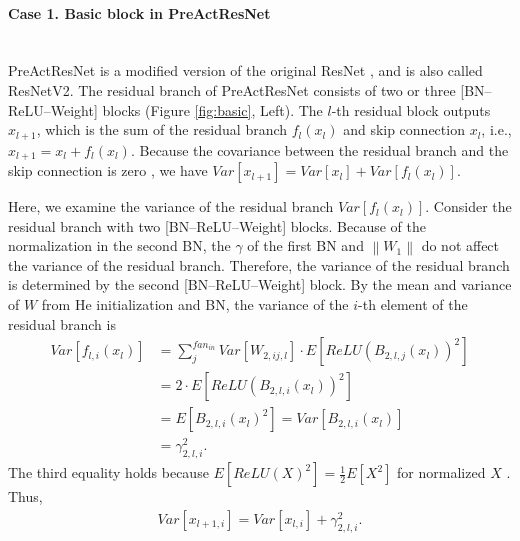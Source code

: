 \documentclass{article}
\begin{document}
\paragraph{Case 1. Basic block in PreActResNet} \ \\
PreActResNet \cite{geccv/HeZRS16} is a modified version of the original ResNet \cite{gcvpr/HeZRS16}, and is also called ResNetV2. The residual branch of PreActResNet consists of two or three [BN--ReLU--Weight] blocks (Figure \ref{fig:basic}, Left). The $l$-th residual block outputs $x_{l+1}$, which is the sum of the residual branch $f_l(x_l)$ and skip connection $x_l$, i.e., $x_{l+1}=x_l + f_l(x_l)$. Because the covariance between the residual branch and the skip connection is zero \cite{gnips/DeS20}, we have $Var[x_{l+1}]=Var[x_l] + Var[f_l(x_l)]$.

Here, we examine the variance of the residual branch $Var[f_l(x_l)]$. Consider the residual branch with two [BN--ReLU--Weight] blocks. Because of the normalization in the second BN, the $\gamma$ of the first BN and $\left\lVert W_1 \right\rVert$ do not affect the variance of the residual branch. Therefore, the variance of the residual branch is determined by the second [BN--ReLU--Weight] block. By the mean and variance of $W$ from He initialization and BN, the variance of the $i$-th element of the residual branch is
\begin{align}
	Var[f_{l,i}(x_l)] & = \sum_j^{fan_{in}} Var[W_{2,ij,l}] \cdot E[ReLU(B_{2,l,j}(x_l))^2] \\
	                  & = 2 \cdot E[ReLU(B_{2,l,i}(x_l))^2]                                 \\
	                  & = E[B_{2,l,i}(x_l)^2] = Var[B_{2,l,i}(x_l)]                         \\
	                  & = \gamma_{2,l,i}^2. \label{eq:var_res_branch}
\end{align}
The third equality holds because $E[ReLU(X)^2] = \frac{1}{2}E[X^2]$ for normalized $X$ \cite{giccv/HeZRS15}. Thus,
\begin{align}
	Var[x_{l+1,i}] = Var[x_{l,i}] + \gamma_{2,l,i}^2.
\end{align}
\end{document}
